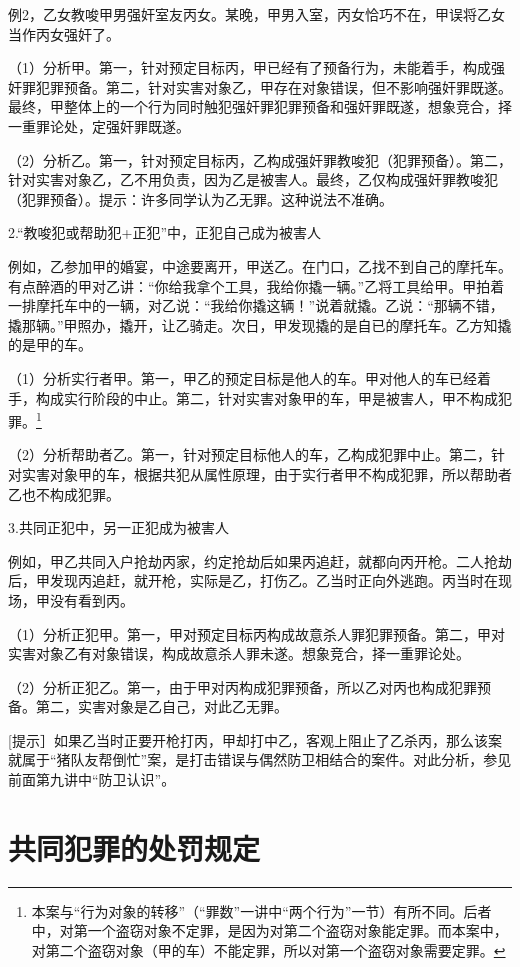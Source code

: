 例2，乙女教唆甲男强奸室友丙女。某晚，甲男入室，丙女恰巧不在，甲误将乙女当作丙女强奸了。

（1）分析甲。第一，针对预定目标丙，甲已经有了预备行为，未能着手，构成强奸罪犯罪预备。第二，针对实害对象乙，甲存在对象错误，但不影响强奸罪既遂。最终，甲整体上的一个行为同时触犯强奸罪犯罪预备和强奸罪既遂，想象竞合，择一重罪论处，定强奸罪既遂。

（2）分析乙。第一，针对预定目标丙，乙构成强奸罪教唆犯（犯罪预备）。第二，针对实害对象乙，乙不用负责，因为乙是被害人。最终，乙仅构成强奸罪教唆犯（犯罪预备）。提示：许多同学认为乙无罪。这种说法不准确。

2.“教唆犯或帮助犯+正犯”中，正犯自己成为被害人

例如，乙参加甲的婚宴，中途要离开，甲送乙。在门口，乙找不到自己的摩托车。有点醉酒的甲对乙讲：“你给我拿个工具，我给你撬一辆。”乙将工具给甲。甲拍着一排摩托车中的一辆，对乙说：“我给你撬这辆！”说着就撬。乙说：“那辆不错，撬那辆。”甲照办，撬开，让乙骑走。次日，甲发现撬的是自已的摩托车。乙方知撬的是甲的车。

（1）分析实行者甲。第一，甲乙的预定目标是他人的车。甲对他人的车已经着手，构成实行阶段的中止。第二，针对实害对象甲的车，甲是被害人，甲不构成犯罪。\footnote{本案与“行为对象的转移”（“罪数”一讲中“两个行为”一节）有所不同。后者中，对第一个盗窃对象不定罪，是因为对第二个盗窃对象能定罪。而本案中，对第二个盗窃对象（甲的车）不能定罪，所以对第一个盗窃对象需要定罪。}

（2）分析帮助者乙。第一，针对预定目标他人的车，乙构成犯罪中止。第二，针对实害对象甲的车，根据共犯从属性原理，由于实行者甲不构成犯罪，所以帮助者乙也不构成犯罪。

3.共同正犯中，另一正犯成为被害人

例如，甲乙共同入户抢劫丙家，约定抢劫后如果丙追赶，就都向丙开枪。二人抢劫后，甲发现丙追赶，就开枪，实际是乙，打伤乙。乙当时正向外逃跑。丙当时在现场，甲没有看到丙。

（1）分析正犯甲。第一，甲对预定目标丙构成故意杀人罪犯罪预备。第二，甲对实害对象乙有对象错误，构成故意杀人罪未遂。想象竞合，择一重罪论处。

（2）分析正犯乙。第一，由于甲对丙构成犯罪预备，所以乙对丙也构成犯罪预备。第二，实害对象是乙自己，对此乙无罪。

[提示］如果乙当时正要开枪打丙，甲却打中乙，客观上阻止了乙杀丙，那么该案就属于“猪队友帮倒忙”案，是打击错误与偶然防卫相结合的案件。对此分析，参见前面第九讲中“防卫认识”。

\section{共同犯罪的处罚规定}

